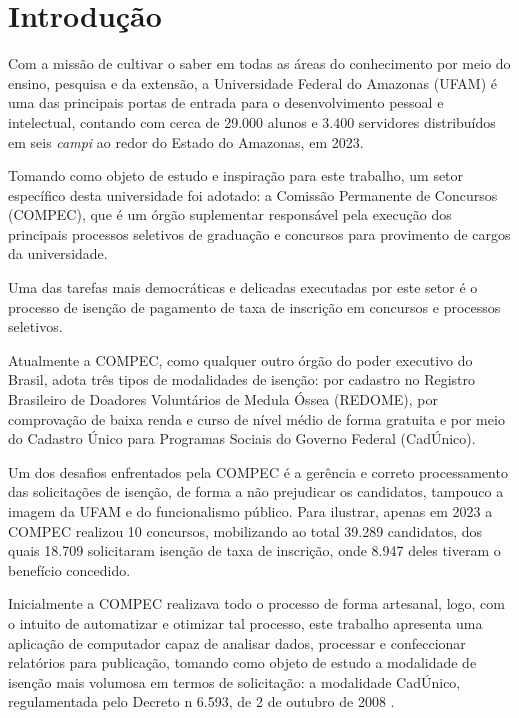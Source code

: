 \documentclass[
	12pt,			%
	openright,		%
	oneside,	
	a4paper,		%
	english,		%
	brazil			%
]{abntex2/abntex2}  %
\begin{document}
	\tableofcontents*
	\cleardoublepage

	\textual

	\chapter{Introdução}
	
		Com a missão de cultivar o saber em todas as áreas do conhecimento por meio do ensino, pesquisa e da extensão, a Universidade Federal do Amazonas (UFAM) é uma das principais portas de entrada para o desenvolvimento pessoal e intelectual, contando com cerca de 29.000 alunos e 3.400 servidores distribuídos em seis \textit{campi} ao redor do Estado do Amazonas, em 2023.
		
		Tomando como objeto de estudo e inspiração para este trabalho, um setor específico desta universidade foi adotado: a Comissão Permanente de Concursos (COMPEC), que é um órgão suplementar responsável pela execução dos principais processos seletivos de graduação e concursos para provimento de cargos da universidade.
		
		Uma das tarefas mais democráticas e delicadas executadas por este setor é o processo de isenção de pagamento de taxa de inscrição em concursos e processos seletivos.
		
		Atualmente a COMPEC, como qualquer outro órgão do poder executivo do Brasil, adota três tipos de modalidades de isenção: por cadastro no Registro Brasileiro de Doadores Voluntários de Medula Óssea (REDOME), por comprovação de baixa renda e curso de nível médio de forma gratuita e por meio do Cadastro Único para Programas Sociais do Governo Federal (CadÚnico).
		
		Um dos desafios enfrentados pela COMPEC é a gerência e correto processamento das solicitações de isenção, de forma a não prejudicar os candidatos, tampouco a imagem da UFAM e do funcionalismo público. Para ilustrar, apenas em 2023 a COMPEC realizou 10 concursos, mobilizando ao total 39.289 candidatos, dos quais 18.709 solicitaram isenção de taxa de inscrição, onde 8.947 deles tiveram o benefício concedido.
		
		Inicialmente a COMPEC realizava todo o processo de forma artesanal, logo, com o intuito de automatizar e otimizar tal processo, este trabalho apresenta uma aplicação de computador capaz de analisar dados, processar e confeccionar relatórios para publicação, tomando como objeto de estudo a modalidade de isenção mais volumosa em termos de solicitação: a modalidade CadÚnico, regulamentada pelo Decreto n{\textordmasculine} 6.593, de 2 de outubro de 2008 \cite{cadunico-decreto}.
		
\end{document}
